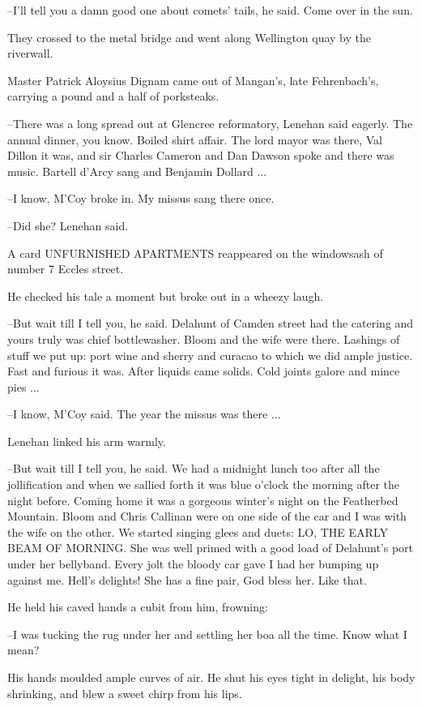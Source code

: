 --I'll tell you a damn good one about comets' tails,
he said.
Come over in the sun.

They crossed to the metal bridge
and went along Wellington quay by
the riverwall.

Master Patrick Aloysius Dignam came out of Mangan's,
late
Fehrenbach's,
carrying a pound and a half of porksteaks.

--There was a long spread out at Glencree reformatory,
Lenehan said
eagerly.
The annual dinner, you know.
Boiled shirt affair.
The lord mayor
was there, Val Dillon it was,
and sir Charles Cameron and Dan Dawson
spoke
and there was music.
Bartell d'Arcy sang and Benjamin Dollard ...

--I know,
M'Coy broke in.
My missus sang there once.

--Did she?
Lenehan said.

A card UNFURNISHED APARTMENTS reappeared
on the windowsash of
number 7 Eccles street.

He checked his tale a moment
but broke out in a wheezy laugh.

--But wait till I tell you, he said.
Delahunt of Camden street had the
catering
and yours truly was chief bottlewasher.
Bloom and the wife were
there.
Lashings of stuff we put up:
port wine and sherry and curacao to
which we did ample justice.
Fast and furious it was.
After liquids came
solids.
Cold joints galore and mince pies ...

--I know, M'Coy said.
The year the missus was there ...

Lenehan linked his arm warmly.

--But wait till I tell you,
he said.
We had a midnight lunch too after all
the jollification
and when we sallied forth
it was blue o'clock the
morning after the night before.
Coming home it was a gorgeous winter's
night on the Featherbed Mountain.
Bloom and Chris Callinan were on one
side of the car
and I was with the wife on the other.
We started singing
glees and duets:
LO, THE EARLY BEAM OF MORNING.
She was well primed with a
good load of Delahunt's port under her bellyband.
Every jolt the bloody
car gave
I had her bumping up against me.
Hell's delights!
She has a fine
pair, God bless her.
Like that.


He held his caved hands a cubit from him,
frowning:

--I was tucking the rug under her
and settling her boa all the time.
Know
what I mean?

His hands moulded ample curves of air.
He shut his eyes tight in
delight,
his body shrinking,
and blew a sweet chirp from his lips.

